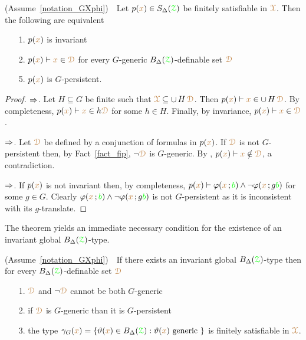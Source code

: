 \begin{theorem}\label{thm_generic_invariant}
  (Assume~\ref{notation_GXphi})\ \  
  Let $p({\color{brown} x})\in S_\Delta({\color{green}\EuScript Z})$ be finitely satisfiable in ${\color{brown}\EuScript X}$.
  Then the following are equivalent
  \begin{itemize}
    \item[1.] $p({\color{brown} x})$ is invariant
    \item[2.] $p({\color{brown} x})\vdash{\color{brown}x}\in{\color{brown}\EuScript D}$ for every $G$-generic $B_\Delta({{\color{green}\EuScript Z}})$-definable set ${\color{brown}\EuScript D}$
    \item[5.] $p({\color{brown} x})$ is $G$-persistent.
  \end{itemize}
\end{theorem}

\begin{proof}
  $\Rightarrow$.
  Let $H\subseteq G$ be finite such that ${\color{brown}\EuScript X}\subseteq\cup\,H\,{\color{brown}\EuScript D}$.
  Then $p({\color{brown} x})\vdash {\color{brown}x}\in\cup\,H\,{\color{brown}\EuScript D}$.
  By completeness, $p({\color{brown} x})\vdash {\color{brown}x}\in h{\color{brown}\EuScript D}$ for some $h\in H$.
  Finally, by invariance,  $p({\color{brown} x})\vdash{\color{brown}x}\in{\color{brown}\EuScript D}$.
  
  $\Rightarrow$.
  Let ${\color{brown}\EuScript D}$ be defined by a conjunction of formulas in $p({\color{brown} x})$.
  If ${\color{brown}\EuScript D}$ is not $G$-persistent then, by Fact~\ref{fact_fip}, $\neg{\color{brown}\EuScript D}$ is $G$-generic. 
  By \ssf2, $p({\color{brown} x})\vdash{\color{brown}x}\notin{\color{brown}\EuScript D}$, a contradiction.

  $\Rightarrow$.
  If $p({\color{brown} x})$ is not invariant then, by completeness, $p({\color{brown} x})\vdash\varphi({\color{brown} x}\,;{\color{green} b})\wedge\neg\varphi({\color{brown} x}\,;g{\color{green} b})$ for some $g\in G$.
  Clearly $\varphi({\color{brown} x}\,;{\color{green} b})\wedge\neg\varphi({\color{brown} x}\,;g{\color{green} b})$ is not $G$-persistent as it is inconsistent with its $g$-translate.
\end{proof}

The theorem yields an immediate necessary condition for the existence of an invariant global $B_\Delta({{\color{green}\EuScript Z}})$-type.

\begin{corollary}\label{corol_def_mu}
  (Assume~\ref{notation_GXphi})\ \  
  If there exists an invariant global $B_\Delta({{\color{green}\EuScript Z}})$-type then for every $B_\Delta({{\color{green}\EuScript Z}})$-definable set ${\color{brown}\EuScript D}$
  \begin{itemize}
    \item[1.] ${\color{brown}\EuScript D}$ and $\neg{\color{brown}\EuScript D}$ cannot be both $G$-generic
    \item[2.] if ${\color{brown}\EuScript D}$ is $G$-generic than it is $G$-persistent
    \item[3.] the type $\gamma_G({\color{brown} x})=\{\vartheta({\color{brown} x})\in B_\Delta({{\color{green}\EuScript Z}}): \vartheta({\color{brown} x})\textrm{ generic }\}$ is finitely satisfiable in ${\color{brown}\EuScript X}$.
  \end{itemize}
\end{corollary}

